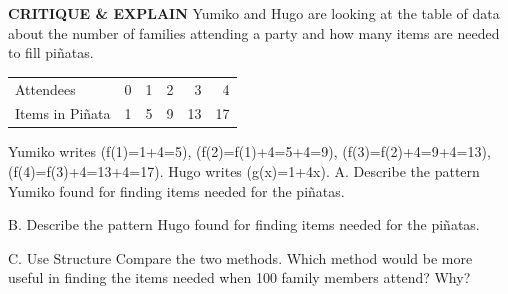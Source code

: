 \documentclass{article}
\newenvironment{model-discuss}{}{}      %
\newcommand{\answer}[1]{}               %
\newcommand{\placeholder}[2]{}          %
\newcommand{\te}[1]{}                   %
\begin{document}
\begin{model-discuss}
\textbf{CRITIQUE \& EXPLAIN}
Yumiko and Hugo are looking at the table of data about the number of families attending a party and how many items are needed to fill piñatas.
\begin{tabular}{lrrrrr}
Attendees & 0 & 1 & 2 & 3 & 4 \\
Items in Piñata & 1 & 5 & 9 & 13 & 17 \\
\end{tabular}
\placeholder{illustration}{Two striped donkey piñatas in yellow, green, blue, purple, and pink, one split open with colorful candy falling between them.}
Yumiko writes
(f(1)=1+4=5),
(f(2)=f(1)+4=5+4=9),
(f(3)=f(2)+4=9+4=13),
(f(4)=f(3)+4=13+4=17).
Hugo writes (g(x)=1+4x).
A. Describe the pattern Yumiko found for finding items needed for the piñatas.
\answer{A. Yumiko looked for the pattern in the numbers---each number was 4 more than the previous number.}
B. Describe the pattern Hugo found for finding items needed for the piñatas.
\answer{B. Hugo used a formula to calculate the number of items needed in the piñatas.}
C. Use Structure Compare the two methods. Which method would be more useful in finding the items needed when 100 family members attend? Why?
\answer{C. Both methods are valid. Hugo's method would be more useful in finding the number of items needed for 100 families because you can quickly calculate (g(100)). Using Yumiko's method, you would have to find (f(1)) through (f(99)) before you could calculate (f(100)).}
\te{Digital and student launch repeat the same material. Digital controls read Go back, ESSENTIAL QUESTION, Enter your answer., and SOLUTION. Critique \& Explain is available at SavvasRealize.com. Printed question C says family members while the introductory paragraph and sample answer count families.}
\placeholder{illustration}{Digital launch repeats the two striped donkey piñatas with falling candy below the attendees/items table.}
\end{model-discuss}
\end{document}
